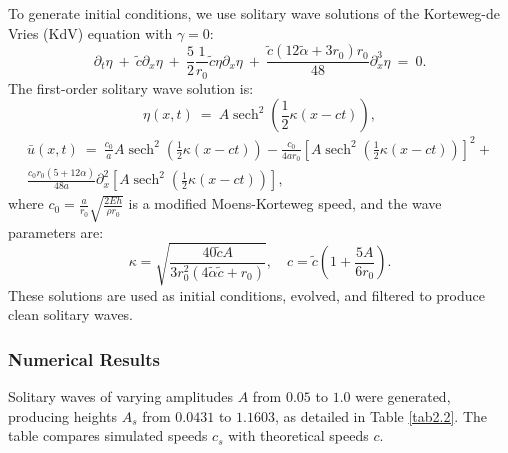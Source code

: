 \documentclass[alpha-refs, 12pt]{wiley-article}
\DeclareMathOperator{\sech}{sech}
\begin{document}
To generate initial conditions, we use solitary wave solutions of the Korteweg-de Vries (KdV) equation with $\gamma = 0$:
\begin{equation}\label{eq:kdvnumerical}
  \partial_t \eta\ +\ \tilde{c} \partial_x \eta\ +\ \frac{5}{2} \frac{1}{r_0} \tilde{c} \eta \partial_x \eta\ +\ \frac{\tilde{c} (12 \tilde{\alpha} + 3 r_0) r_0}{48} \partial_x^3 \eta\ =\ 0.
\end{equation}
The first-order solitary wave solution is:
\begin{equation}\label{eq:num1}
  \eta(x,t)\ =\ A \sech^2 \left( \frac{1}{2} \kappa (x - c t) \right),
\end{equation}
\begin{multline}\label{eq:num2}
  \bar{u}(x,t)\ =\ \frac{c_0}{a} A \sech^2 \left( \frac{1}{2} \kappa (x - c t) \right) - \frac{c_0}{4 a r_0} \left[ A \sech^2 \left( \frac{1}{2} \kappa (x - c t) \right) \right]^2 + \\
  \frac{c_0 r_0 (5 + 12 \alpha)}{48 a} \partial_x^2 \left[ A \sech^2 \left( \frac{1}{2} \kappa (x - c t) \right) \right],
\end{multline}
where $c_0 = \frac{a}{r_0} \sqrt{\frac{2 E h}{\rho r_0}}$ is a modified Moens-Korteweg speed, and the wave parameters are:
\[
  \kappa = \sqrt{\frac{40 \tilde{c} A}{3 r_0^2 (4 \tilde{\alpha} \tilde{c} + r_0)}}, \quad c = \tilde{c} \left( 1 + \frac{5 A}{6 r_0} \right).
\]
These solutions are used as initial conditions, evolved, and filtered to produce clean solitary waves.

\subsubsection{Numerical Results}

Solitary waves of varying amplitudes $A$ from $0.05$ to $1.0$ were generated, producing heights $A_s$ from $0.0431$ to $1.1603$, as detailed in Table \ref{tab2.2}. The table compares simulated speeds $c_s$ with theoretical speeds $c$.
\end{document}
